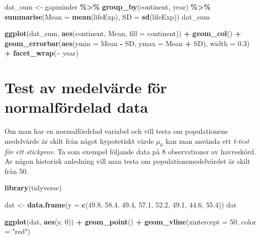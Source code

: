 \documentclass[
]{book}
\newenvironment{Shaded}{\begin{snugshade}}{\end{snugshade}}
\newcommand{\AttributeTok}[1]{\textcolor[rgb]{0.13,0.29,0.53}{#1}}
\newcommand{\DecValTok}[1]{\textcolor[rgb]{0.00,0.00,0.81}{#1}}
\newcommand{\FloatTok}[1]{\textcolor[rgb]{0.00,0.00,0.81}{#1}}
\newcommand{\FunctionTok}[1]{\textcolor[rgb]{0.13,0.29,0.53}{\textbf{#1}}}
\newcommand{\NormalTok}[1]{#1}
\newcommand{\OtherTok}[1]{\textcolor[rgb]{0.56,0.35,0.01}{#1}}
\newcommand{\SpecialCharTok}[1]{\textcolor[rgb]{0.81,0.36,0.00}{\textbf{#1}}}
\newcommand{\StringTok}[1]{\textcolor[rgb]{0.31,0.60,0.02}{#1}}
\theoremstyle{definition}
\theoremstyle{definition}
\theoremstyle{definition}
\theoremstyle{definition}
\theoremstyle{remark}
\begin{document}
\begin{Shaded}
\begin{Highlighting}[]
\NormalTok{dat\_sum }\OtherTok{\textless{}{-}}\NormalTok{ gapminder }\SpecialCharTok{\%\textgreater{}\%} 
  \FunctionTok{group\_by}\NormalTok{(continent, year) }\SpecialCharTok{\%\textgreater{}\%} 
  \FunctionTok{summarise}\NormalTok{(}\AttributeTok{Mean =} \FunctionTok{mean}\NormalTok{(lifeExp),}
            \AttributeTok{SD =} \FunctionTok{sd}\NormalTok{(lifeExp))}
\NormalTok{dat\_sum}

\FunctionTok{ggplot}\NormalTok{(dat\_sum, }\FunctionTok{aes}\NormalTok{(continent, Mean, }\AttributeTok{fill =}\NormalTok{ continent)) }\SpecialCharTok{+}
  \FunctionTok{geom\_col}\NormalTok{() }\SpecialCharTok{+}
  \FunctionTok{geom\_errorbar}\NormalTok{(}\FunctionTok{aes}\NormalTok{(}\AttributeTok{ymin =}\NormalTok{ Mean }\SpecialCharTok{{-}}\NormalTok{ SD, }\AttributeTok{ymax =}\NormalTok{ Mean }\SpecialCharTok{+}\NormalTok{ SD), }
                \AttributeTok{width =} \FloatTok{0.3}\NormalTok{) }\SpecialCharTok{+}
  \FunctionTok{facet\_wrap}\NormalTok{(}\SpecialCharTok{\textasciitilde{}}\NormalTok{ year)}
\end{Highlighting}
\end{Shaded}

\section{Test av medelvärde för normalfördelad data}\label{test-av-medelvuxe4rde-fuxf6r-normalfuxf6rdelad-data}

Om man har en normalfördelad variabel och vill testa om populationens medelvärde är skilt från något hypotetiskt värde \(\mu_0\) kan man använda ett \emph{t-test för ett stickprov}. Ta som exempel följande data på 8 observationer av havreskörd. Av någon historisk anledning vill man testa om populationsmedelvärdet är skilt från 50.

\begin{Shaded}
\begin{Highlighting}[]
\FunctionTok{library}\NormalTok{(tidyverse)}

\NormalTok{dat }\OtherTok{\textless{}{-}} \FunctionTok{data.frame}\NormalTok{(}\AttributeTok{y =} \FunctionTok{c}\NormalTok{(}\FloatTok{49.8}\NormalTok{, }\FloatTok{58.4}\NormalTok{, }\FloatTok{49.4}\NormalTok{, }\FloatTok{57.1}\NormalTok{, }
                        \FloatTok{52.2}\NormalTok{, }\FloatTok{49.1}\NormalTok{, }\FloatTok{44.6}\NormalTok{, }\FloatTok{55.4}\NormalTok{))}
\NormalTok{dat}

\FunctionTok{ggplot}\NormalTok{(dat, }\FunctionTok{aes}\NormalTok{(y, }\DecValTok{0}\NormalTok{)) }\SpecialCharTok{+} 
  \FunctionTok{geom\_point}\NormalTok{() }\SpecialCharTok{+}
  \FunctionTok{geom\_vline}\NormalTok{(}\AttributeTok{xintercept =} \DecValTok{50}\NormalTok{, }\AttributeTok{color =} \StringTok{"red"}\NormalTok{)}
\end{Highlighting}
\end{Shaded}
\end{document}
